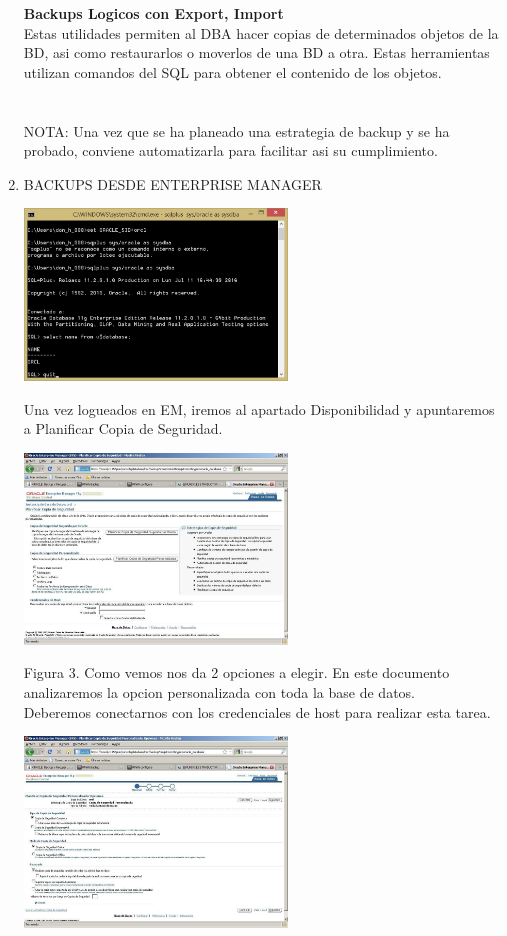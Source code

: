 \documentclass[a4paper,twocolumn,10pt]{article}
\begin{document}
\begin{enumerate}[4.1]
	\textbf{Backups Logicos con Export, Import}  
	\\Estas utilidades permiten al DBA hacer copias de determinados objetos de la BD, asi como restaurarlos o moverlos de una BD a otra. Estas herramientas utilizan comandos del SQL para obtener el contenido de los objetos.\\
	\\
	\\NOTA: Una vez que se ha planeado una estrategia de backup y se ha probado, conviene automatizarla para facilitar asi su cumplimiento.



\item BACKUPS  DESDE  ENTERPRISE  MANAGER

\begin{center}
	\includegraphics[width=7cm]{./Imagenes/b1}  
	\end{center}
	Una  vez  logueados  en  EM,  iremos  al  apartado Disponibilidad y  apuntaremos  a Planificar  Copia de Seguridad.
	\begin{center}
	\includegraphics[width=7cm]{./Imagenes/b2}  
	\end{center}
	Figura 3. Como vemos nos da 2 opciones a elegir. En este documento analizaremos la opcion personalizada con toda la base de datos.
  	\\ Deberemos conectarnos con los credenciales de host para realizar esta tarea.
	\begin{center}
	\includegraphics[width=7cm]{./Imagenes/b3}  

\end{center}
\end{enumerate}
\end{document}
